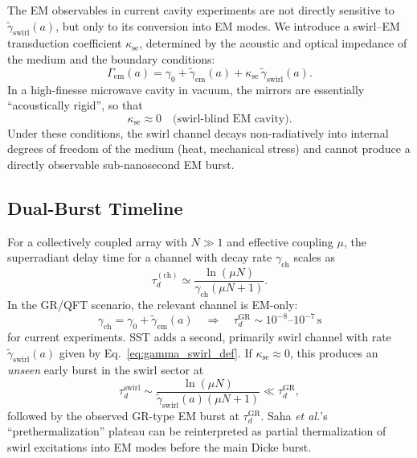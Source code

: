 \documentclass[10pt,reprint,aps,onecolumn,nofootinbib]{revtex4-2}
\begin{document}
    The EM observables in current cavity experiments \cite{Deswal2025,Zheng2025,Saha2025}
    are not directly sensitive to $\tilde\gamma_{\text{swirl}}(a)$, but only to
    its conversion into EM modes. We introduce a swirl--EM transduction
    coefficient $\kappa_{\text{se}}$, determined by the acoustic and optical
    impedance of the medium and the boundary conditions:
    \begin{equation}
        \Gamma_{\text{em}}(a)
        = \gamma_0
        + \tilde\gamma_{\text{em}}(a)
        + \kappa_{\text{se}}\,\tilde\gamma_{\text{swirl}}(a).
        \label{eq:gamma_em_effective}
    \end{equation}
    In a high-finesse microwave cavity in vacuum, the mirrors are essentially
    ``acoustically rigid'', so that
    \begin{equation}
        \kappa_{\text{se}} \approx 0
        \quad\text{(swirl-blind EM cavity)}.
    \end{equation}
    Under these conditions, the swirl channel decays non-radiatively into
    internal degrees of freedom of the medium (heat, mechanical stress) and
    cannot produce a directly observable sub-nanosecond EM burst.

    \subsection{Dual-Burst Timeline}

        For a collectively coupled array with $N\gg 1$ and effective coupling
        $\mu$, the superradiant delay time for a channel with decay rate
        $\gamma_{\text{ch}}$ scales as \cite{GrossHaroche1982,Deswal2025}
        \begin{equation}
            \tau_d^{(\text{ch})}
            \simeq \frac{\ln(\mu N)}{\gamma_{\text{ch}}(\mu N + 1)}.
        \end{equation}
        In the GR/QFT scenario, the relevant channel is EM-only:
        \begin{equation}
            \gamma_{\text{ch}} = \gamma_0 + \tilde\gamma_{\text{em}}(a)
            \quad\Rightarrow\quad
            \tau_d^{\text{GR}} \sim 10^{-8}\text{--}10^{-7}\,\mathrm{s}
        \end{equation}
        for current experiments. SST adds a second, primarily swirl channel with
        rate $\tilde\gamma_{\text{swirl}}(a)$ given by
        Eq.~\eqref{eq:gamma_swirl_def}. If $\kappa_{\text{se}}\approx 0$, this
        produces an \emph{unseen} early burst in the swirl sector at
        \begin{equation}
            \tau_d^{\text{swirl}}
            \sim \frac{\ln(\mu N)}{\tilde\gamma_{\text{swirl}}(a)(\mu N + 1)}
            \ll \tau_d^{\text{GR}},
        \end{equation}
        followed by the observed GR-type EM burst at $\tau_d^{\text{GR}}$.
        Saha \emph{et al.}'s ``prethermalization'' plateau \cite{Saha2025} can be
        reinterpreted as partial thermalization of swirl excitations into EM modes
        before the main Dicke burst.
\end{document}
